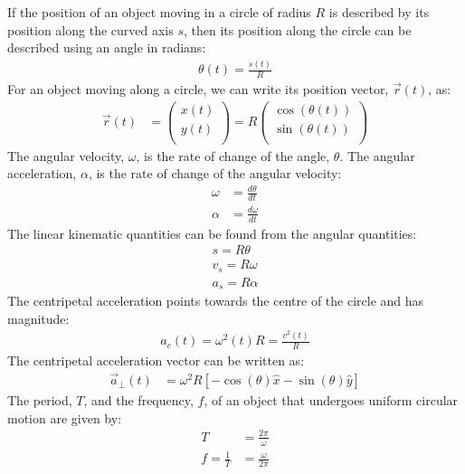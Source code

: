 \begin{importantEquations}
If the position of an object moving in a circle of radius $R$ is described by its position along the curved axis $s$, then its position along the circle can be described using an angle in radians:
\begin{align*}
\theta(t)=\frac{s(t)}{R}
\end{align*}
For an object moving along a circle, we can write its position vector, $\vec r(t)$, as:
\begin{align*}
\vec r(t)&= \begin{pmatrix}
          x(t) \\
          y(t) \\
        \end{pmatrix}
        =R \begin{pmatrix}
          \cos(\theta(t)) \\
          \sin(\theta(t)) \\
        \end{pmatrix}
\end{align*}
The angular velocity, $\omega$, is the rate of change of the angle, $\theta$. The angular acceleration, $\alpha$, is the rate of change of the angular velocity:
\begin{align*}
\omega &= \frac{d\theta}{dt}\\
\alpha &= \frac{d\omega}{dt}
\end{align*}
The linear kinematic quantities can be found from the angular quantities:
\begin{align*}
s=R\theta\\
v_s=R\omega\\
a_s=R\alpha
\end{align*}
The centripetal acceleration points towards the centre of the circle and has magnitude:
\begin{align*}
a_c(t) = \omega^2(t)R = \frac{v^2(t)}{R}
\end{align*}
The centripetal acceleration vector can be written as:
\begin{align*}
\vec a_{\bot}(t)&=\omega^2 R[-\cos(\theta)\hat x-\sin(\theta)\hat y]
\end{align*}
The period, $T$, and the frequency, $f$, of an object that undergoes uniform circular motion are given by:
\begin{align*}
T&=\frac{2\pi}{\omega}\\
f=\frac{1}{T}&=\frac{\omega}{2\pi}
\end{align*}
\end{importantEquations}


\newpage
